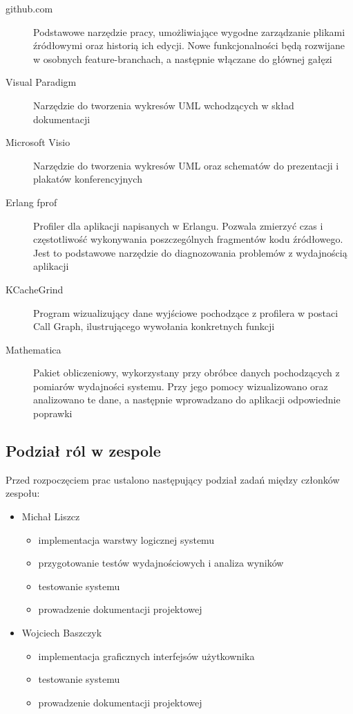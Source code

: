 \begin{description}
	\item[github.com]\cite{github-www} Podstawowe narzędzie pracy, umożliwiające wygodne zarządzanie plikami źródłowymi oraz historią ich edycji.  Nowe funkcjonalności będą rozwijane w osobnych feature-branchach, a następnie włączane do głównej gałęzi
	\item[Visual Paradigm]\cite{paradigm-www} Narzędzie do tworzenia wykresów UML wchodzących w skład dokumentacji
	\item[Microsoft Visio]\cite{visio-www} Narzędzie do tworzenia wykresów UML oraz schematów do prezentacji i plakatów konferencyjnych
	\item[Erlang fprof]\cite{fprof-www} Profiler dla aplikacji napisanych w Erlangu. Pozwala zmierzyć czas i częstotliwość wykonywania poszczególnych fragmentów kodu źródłowego. Jest to podstawowe narzędzie do diagnozowania problemów z wydajnością aplikacji
	\item[KCacheGrind]\cite{grind-www} Program wizualizujący dane wyjściowe pochodzące z profilera w postaci Call Graph, ilustrującego wywołania konkretnych funkcji
	\item[Mathematica]\cite{mathematica-www} Pakiet obliczeniowy, wykorzystany przy obróbce danych pochodzących z pomiarów wydajności systemu. Przy jego pomocy wizualizowano oraz analizowano te dane, a następnie wprowadzano do aplikacji odpowiednie poprawki
\end{description}

\subsection{Podział ról w zespole}
Przed rozpoczęciem prac ustalono następujący podział zadań między członków zespołu:

\begin{itemize}
\item Michał Liszcz
\begin{itemize}
	\item implementacja warstwy logicznej systemu
	\item przygotowanie testów wydajnościowych i analiza wyników
	\item testowanie systemu
	\item prowadzenie dokumentacji projektowej
\end{itemize}

\item Wojciech Baszczyk
\begin{itemize}
	\item implementacja graficznych interfejsów użytkownika
	\item testowanie systemu
	\item prowadzenie dokumentacji projektowej
\end{itemize}
\end{itemize}

